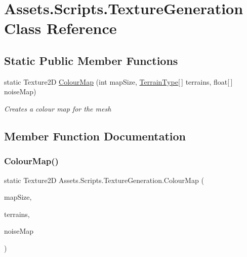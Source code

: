 \hypertarget{class_assets_1_1_scripts_1_1_texture_generation}{}\section{Assets.\+Scripts.\+Texture\+Generation Class Reference}
\label{class_assets_1_1_scripts_1_1_texture_generation}
\subsection*{Static Public Member Functions}
\begin{DoxyCompactItemize}
\item 
static Texture2D \mbox{\hyperlink{class_assets_1_1_scripts_1_1_texture_generation_a372ae39983281269f02f8852b3734526}{Colour\+Map}} (int map\+Size, \mbox{\hyperlink{struct_assets_1_1_scripts_1_1_terrain_type}{Terrain\+Type}}\mbox{[}$\,$\mbox{]} terrains, float\mbox{[}$\,$\mbox{]} noise\+Map)
\begin{DoxyCompactList}\small\item\em Creates a colour map for the mesh \end{DoxyCompactList}\end{DoxyCompactItemize}


\subsection{Member Function Documentation}
\mbox{\label{class_assets_1_1_scripts_1_1_texture_generation_a372ae39983281269f02f8852b3734526}} 
\subsubsection{\texorpdfstring{ColourMap()}{ColourMap()}}
{\footnotesize\ttfamily static Texture2D Assets.\+Scripts.\+Texture\+Generation.\+Colour\+Map (\begin{DoxyParamCaption}\item[{int}]{map\+Size,  }\item[{\mbox{\hyperlink{struct_assets_1_1_scripts_1_1_terrain_type}{Terrain\+Type}} \mbox{[}$\,$\mbox{]}}]{terrains,  }\item[{float \mbox{[}$\,$\mbox{]}}]{noise\+Map }\end{DoxyParamCaption})\hspace{0.3cm}{\ttfamily [static]}}



